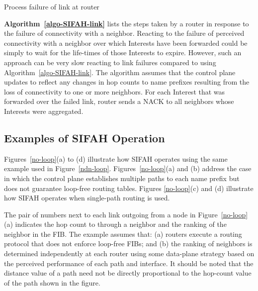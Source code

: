 \documentclass{ancs15-alternate}
\begin{document}
 \vspace{-0.1in}
\begin{algorithm}[h]
\caption{Process failure of link    at router  }
\label{algo-SIFAH-link}
{\fontsize{8}{8}\selectfont
\begin{algorithmic}[1]
	\IF{}
	\ENDIF
	\IF{}	
		\STATE{
		; }	
		\IF{}
\ENDFOR	
		
		\ENDIF
	\ENDIF
\ENDFOR

\end{algorithmic}}
\end{algorithm}



{\bf Algorithm~\ref{algo-SIFAH-link}} lists the steps taken by a router in response to the failure of connectivity with a neighbor. 
Reacting to the failure of perceived connectivity with a neighbor over which Interests have been forwarded  could be simply to wait for the life-times of those Interests to expire. However, such an approach can be  very slow  reacting to link failures compared to using Algorithm~\ref{algo-SIFAH-link}.
The algorithm assumes that the control plane updates  to reflect any changes in hop counts  to name prefixes resulting from the loss of connectivity to one or more neighbors. 
For each Interest that was forwarded over the failed link, router  sends a NACK to all   neighbors whose Interests were aggregated.



\subsection{Examples of SIFAH Operation}

Figures~\ref{no-loop}(a) to (d) illustrate how SIFAH operates using the 
same example used in Figure~\ref{ndn-loop}.
Figures~\ref{no-loop}(a) and (b) address the case in which 
the control plane establishes  multiple paths to each name prefix but 
does not guarantee loop-free routing tables.  Figures \ref{no-loop}(c) and (d) illustrate how SIFAH operates when single-path routing is used.

The pair of numbers next to each link outgoing from a node in Figure~\ref{no-loop}(a) 
indicates the hop count to  through 
a neighbor and the ranking of the neighbor in the FIB. The example assumes that: (a) routers execute a routing protocol that does not enforce loop-free  FIBs; and (b) the ranking of neighbors  is determined independently at each router using some data-plane strategy based on the  perceived performance of each path and interface. 
It should be noted that the distance value of a path need not be directly proportional to the hop-count value of the path shown in the figure. 
\end{document}

